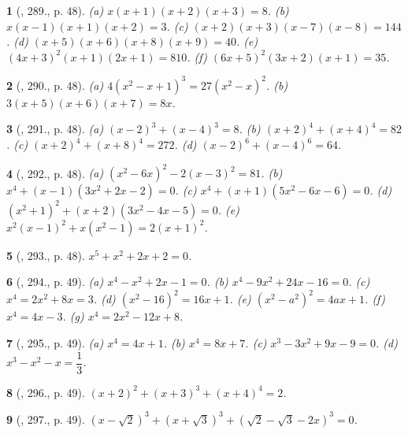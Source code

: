 \documentclass{article}
\newtheorem{baitoan}{}
\begin{document}
\begin{baitoan}[\cite{Binh_Toan_9_tap_2}, 289., p. 48]
	(a) $x(x + 1)(x + 2)(x + 3) = 8$. (b) $x(x - 1)(x + 1)(x + 2) = 3$. (c) $(x + 2)(x + 3)(x - 7)(x - 8) = 144$. (d) $(x + 5)(x + 6)(x + 8)(x + 9) = 40$. (e) $(4x + 3)^2(x + 1)(2x + 1) = 810$. (f) $(6x + 5)^2(3x + 2)(x + 1) = 35$.
\end{baitoan}

\begin{baitoan}[\cite{Binh_Toan_9_tap_2}, 290., p. 48]
	(a) $4(x^2 - x + 1)^3 = 27(x^2 - x)^2$. (b) $3(x + 5)(x + 6)(x + 7) = 8x$.
\end{baitoan}

\begin{baitoan}[\cite{Binh_Toan_9_tap_2}, 291., p. 48]
	(a) $(x - 2)^3 + (x - 4)^3 = 8$. (b) $(x + 2)^4 + (x + 4)^4 = 82$. (c) $(x + 2)^4 + (x + 8)^4 = 272$. (d) $(x - 2)^6 + (x - 4)^6 = 64$.
\end{baitoan}

\begin{baitoan}[\cite{Binh_Toan_9_tap_2}, 292., p. 48]
	(a) $(x^2 - 6x)^2 - 2(x - 3)^2 = 81$. (b) $x^4 + (x - 1)(3x^2 + 2x - 2) = 0$. (c) $x^4 + (x + 1)(5x^2 - 6x - 6) = 0$. (d) $(x^2 + 1)^2 + (x + 2)(3x^2 - 4x - 5) = 0$. (e) $x^2(x - 1)^2 + x(x^2 - 1) = 2(x + 1)^2$.
\end{baitoan}

\begin{baitoan}[\cite{Binh_Toan_9_tap_2}, 293., p. 48]
	$x^5 + x^2 + 2x + 2 = 0$.
\end{baitoan}

\begin{baitoan}[\cite{Binh_Toan_9_tap_2}, 294., p. 49]
	(a) $x^4 - x^2 + 2x - 1 = 0$. (b) $x^4 - 9x^2 + 24x - 16 = 0$. (c) $x^4 = 2x^2 + 8x = 3$. (d) $(x^2 - 16)^2 = 16x + 1$. (e) $(x^2 - a^2)^2 = 4ax + 1$. (f) $x^4 = 4x - 3$. (g) $x^4 = 2x^2 - 12x + 8$.
\end{baitoan}

\begin{baitoan}[\cite{Binh_Toan_9_tap_2}, 295., p. 49]
	(a) $x^4 = 4x + 1$. (b) $x^4 = 8x + 7$. (c) $x^3 - 3x^2 + 9x - 9 = 0$. (d) $x^3 - x^2 - x = \dfrac{1}{3}$.
\end{baitoan}

\begin{baitoan}[\cite{Binh_Toan_9_tap_2}, 296., p. 49]
	$(x + 2)^2 + (x + 3)^3 + (x + 4)^4 = 2$.
\end{baitoan}

\begin{baitoan}[\cite{Binh_Toan_9_tap_2}, 297., p. 49]
	$(x - \sqrt{2})^3 + (x + \sqrt{3})^3 + (\sqrt{2} - \sqrt{3} - 2x)^3 = 0$.
\end{baitoan}
\end{document}
